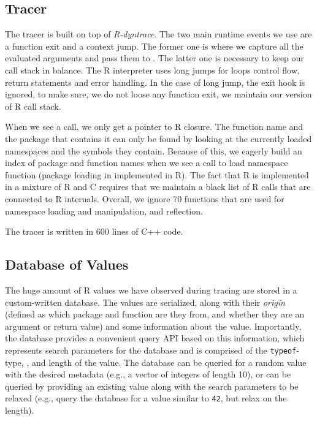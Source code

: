\documentclass[sigplan,anonymous,review]{acmart}
\begin{document}
\subsection{Tracer}

The tracer is built on top of \emph{R-dyntrace}.
The two main runtime events we use are a function exit and a context jump.
The former one is where we capture all the evaluated arguments and pass them to \sxpdb.
The latter one is necessary to keep our call stack in balance.
The R interpreter uses long jumps for loops control flow, return statements and error handling.
In the case of long jump, the exit hook is ignored, to make sure, we do not loose any function exit, we maintain our version of R call stack.

When we see a call, we only get a pointer to R closure.
The function name and the package that contains it can only be found by looking at the currently loaded namespaces and the symbols they contain.
Because of this, we eagerly build an index of package and function names when we see a call to load namespace function (package loading in implemented in R).
The fact that R is implemented in a mixture of R and C requires that we maintain a black list of R calls that are connected to R internals.
Overall, we ignore 70 functions that are used for namespace loading and manipulation, and reflection.

The tracer is written in 600 lines of C++ code.


\subsection{Database of Values}

The huge amount of R values we have observed during tracing are stored in a custom-written database. 
The values are serialized, along with their \textit{origin} (defined as which package and function are they from, and whether they are an argument or return value) and some information about the value. %
Importantly, the database provides a convenient query API based on this information, which represents search parameters for the database and is comprised of the {\tt typeof}-type, , and length of the value. 
The database can be queried for a random value with the desired metadata (e.g., a vector of integers of length 10), or can be queried by providing an existing value along with the search parameters to be relaxed (e.g., query the database for a value similar to {\tt 42}, but relax on the length).
\end{document}
